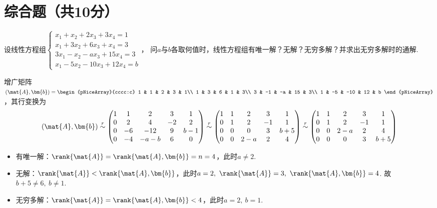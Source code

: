 \newpage
\section{综合题（共10分）}
\setcounter{prob}{0}
\begin{problem}
设线性方程组$\begin{cases}
    x_1+x_2+2x_3+3x_4=1\\
    x_1+3x_2+6x_3+x_4=3\\
    3x_1-x_2-ax_3+15x_4=3\\
    x_1-5x_2-10x_3+12x_4=b
\end{cases}$，
问$a$与$b$各取何值时，线性方程组有唯一解？无解？无穷多解？并求出无穷多解时的通解.
\end{problem}
\begin{solution}
    增广矩阵$(\mat{A},\bm{b})=\begin{pNiceArray}{cccc:c}
        1 & 1 & 2 & 3 & 1\\
        1 & 3 & 6 & 1 & 3\\
        3 & -1 & -a & 15 & 3\\
        1 & -5 & -10 & 12 & b
    \end{pNiceArray}$，其行变换为
    \[(\mat{A},\bm{b})\overset{r}{\sim}\begin{pmatrix}
        1 & 1 & 2 & 3 & 1\\
        0 & 2 & 4 & -2& 2\\
        0 &-6 &-12& 9 &b-1\\
        0 &-4 &-a-b&6 & 0
    \end{pmatrix}\overset{r}{\sim}
    \begin{pmatrix}
        1 & 1 & 2 & 3 & 1\\
        0 & 1 & 2 &-1 & 1\\
        0 & 0 & 0 & 3&b+5\\
        0 & 0 &2-a& 2 & 4
    \end{pmatrix}\overset{r}{\sim}
    \begin{pmatrix}
        1 & 1 & 2 & 3 & 1\\
        0 & 1 & 2 &-1 & 1\\
        0 & 0 &2-a& 2 & 4\\
        0 & 0 & 0 & 3& b+5
    \end{pmatrix}\]
    \begin{itemize}
        \item 有唯一解：$\rank{\mat{A}}=\rank{\mat{A},\bm{b}}=n=4$，此时$a\neq 2$.
        \item 无解：$\rank{\mat{A}}<\rank{\mat{A},\bm{b}}$，此时$a=2,\ \rank{\mat{A}}=3,\ \rank{\mat{A},\bm{b}}=4$. 故$b+5\neq 6,\ b\neq 1$.
        \item 无穷多解：$\rank{\mat{A}}=\rank{\mat{A},\bm{b}}<4$，此时$a=2,\ b=1$.
    \end{itemize}
\end{solution}


